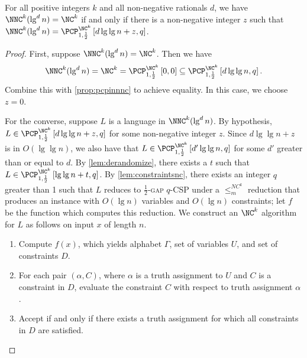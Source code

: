 \documentclass[]{article}
\newcommand{\PCPcs}[5]{\PCP^{#1}_{#2, #3}\left[#4, #5\right]}
\begin{document}
\begin{lemma}\label{lem:1}
  For all positive integers $k$ and all non-negative rationals $d$, we have $\NNC^k(\lg^d n) = \NC^k$ if and only if there is a non-negative integer $z$ such that $\NNC^k(\lg^d n) = \PCPcs{\NC^k}{1}{\frac{1}{2}}{d \lg \lg n + z}{q}$.
\end{lemma}
\begin{proof}
  First, suppose $\NNC^k(\lg^d n) = \NC^k$.
  Then we have
  \begin{equation*}
    \NNC^k(\lg^d n)
    = \NC^k
    = \PCPcs{\NC^k}{1}{\frac{1}{2}}{0}{0}
    \subseteq \PCPcs{\NC^k}{1}{\frac{1}{2}}{d \lg \lg n}{q}.
  \end{equation*}
  Combine this with \autoref{prop:pcpinnnc} to achieve equality.
  In this case, we choose $z = 0$.

  For the converse, suppose $L$ is a language in $\NNC^k(\lg^d n)$.
  By hypothesis, $L \in \PCPcs{\NC^k}{1}{\frac{1}{2}}{d \lg \lg n + z}{q}$ for some non-negative integer $z$.
  Since $d \lg \lg n + z$ is in $O(\lg \lg n)$, we also have that $L \in \PCPcs{\NC^k}{1}{\frac{1}{2}}{d' \lg \lg n}{q}$ for some $d'$ greater than or equal to $d$.
  By \autoref{lem:derandomize}, there exists a $t$ such that $L \in \PCPcs{\NC^k}{1}{\frac{1}{2}}{\lg \lg n + t}{q}$.
  By \autoref{lem:constraintsnc}, there exists an integer $q$ greater than 1 such that $L$ reduces to \textsc{$\frac{1}{2}$-gap $q$-CSP} under a $\leq_m^{NC^k}$ reduction that produces an instance with $O(\lg n)$ variables and $O(\lg n)$ constraints; let $f$ be the function which computes this reduction.
  We construct an $\NC^k$ algorithm for $L$ as follows on input $x$ of length $n$.
  \begin{enumerate}
  \item Compute $f(x)$, which yields alphabet $\Gamma$, set of variables $U$, and set of constraints $D$.
  \item For each pair $(\alpha, C)$, where $\alpha$ is a truth assignment to $U$ and $C$ is a constraint in $D$, evaluate the constraint $C$ with respect to truth assignment $\alpha$.
  \item Accept if and only if there exists a truth assignment for which all constraints in $D$ are satisfied.
  \end{enumerate}


\end{proof}
\end{document}
